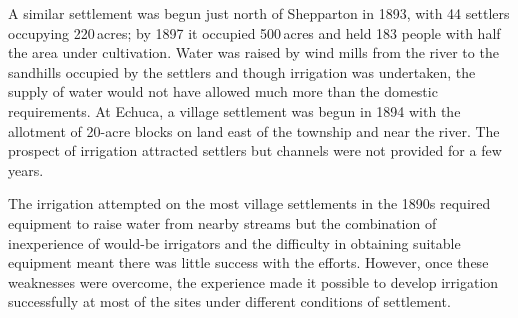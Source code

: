 A similar settlement was begun just north of Shepparton
 in 1893, with 44 settlers occupying 220\,acres;
by 1897 it occupied 500\,acres and held 183 people with half the area
under cultivation.  Water was raised by wind mills from the river to
the sandhills occupied by the settlers and though irrigation was
undertaken, the supply of water would not have allowed much more than
the domestic requirements.  At Echuca,  a village
settlement was begun in 1894 with the allotment of 20-acre blocks on
land east of the township and near the river.  The prospect of
irrigation attracted settlers but channels were not provided for a few
years.

\closure
The irrigation attempted on the most village settlements in the 1890s
required equipment to raise water from nearby streams but the
combination of inexperience of would-be irrigators and the difficulty
in obtaining suitable equipment meant there was little success with
the efforts.  However, once these weaknesses were overcome, the
experience made it possible to develop irrigation successfully at most
of the sites under different conditions of settlement.


